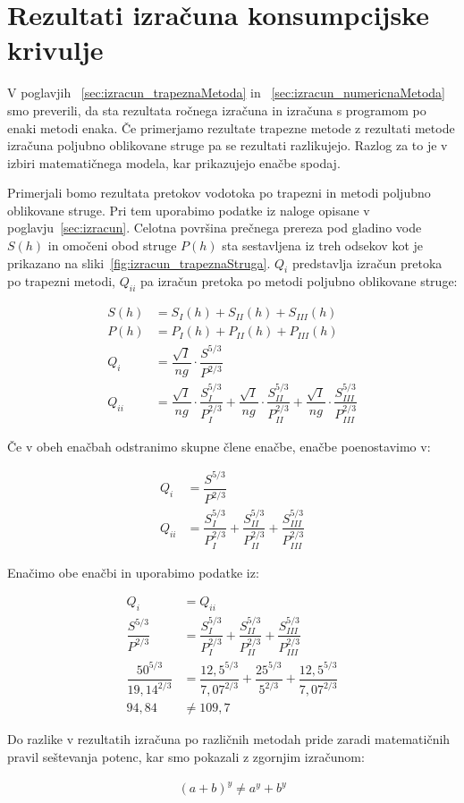 \section{Rezultati izračuna konsumpcijske krivulje}
V poglavjih ~\ref{sec:izracun_trapeznaMetoda} in ~\ref{sec:izracun_numericnaMetoda} smo preverili, da sta rezultata ročnega izračuna in izračuna s programom po enaki metodi enaka. Če primerjamo rezultate trapezne metode z rezultati metode izračuna poljubno oblikovane struge pa se rezultati razlikujejo. Razlog za to je v izbiri matematičnega modela, kar prikazujejo enačbe spodaj.

Primerjali bomo rezultata pretokov vodotoka po trapezni in metodi poljubno oblikovane struge. Pri tem uporabimo podatke iz naloge opisane v poglavju~\ref{sec:izracun}. Celotna površina prečnega prereza pod gladino vode $S(h)$ in omočeni obod struge $P(h)$ sta sestavljena iz treh odsekov kot je prikazano na sliki~\ref{fig:izracun_trapeznaStruga}. $Q_i$ predstavlja izračun pretoka po trapezni metodi, $Q_{ii}$ pa izračun pretoka po metodi poljubno oblikovane struge:
\begin{ceqn}
	\begin{align}
	S(h)&= S_I(h) + S_{II}(h) + S_{III}(h)\\
	P(h)&= P_I(h) + P_{II}(h) + P_{III}(h)\\
	Q_i &= \dfrac{\sqrt{I}}{ng} \cdot \dfrac{S^{5/3}}{P^{2/3}} \\
	Q_{ii} &= \dfrac{\sqrt{I}}{ng} \cdot \dfrac{S_I^{5/3}}{P_I^{2/3}} + \dfrac{\sqrt{I}}{ng} \cdot \dfrac{S_{II}^{5/3}}{P_{II}^{2/3}} + \dfrac{\sqrt{I}}{ng} \cdot \dfrac{S_{III}^{5/3}}{P_{III}^{2/3}}
	\end{align}
\end{ceqn}

Če v obeh enačbah odstranimo skupne člene enačbe, enačbe poenostavimo v:

\begin{ceqn}
	\begin{align}
	Q_i &=\dfrac{S^{5/3}}{P^{2/3}}\\
	Q_{ii} &= \dfrac{S_I^{5/3}}{P_I^{2/3}} + \dfrac{S_{II}^{5/3}}{P_{II}^{2/3}} + \dfrac{S_{III}^{5/3}}{P_{III}^{2/3}}
	\end{align}
\end{ceqn}


Enačimo obe enačbi in uporabimo podatke iz:
\begin{ceqn}
	\begin{align}
	Q_i &= Q_{ii}\\
	\dfrac{S^{5/3}}{P^{2/3}} &= \dfrac{S_I^{5/3}}{P_I^{2/3}} + \dfrac{S_{II}^{5/3}}{P_{II}^{2/3}} + \dfrac{S_{III}^{5/3}}{P_{III}^{2/3}}\\
	\dfrac{50^{5/3}}{19,14^{2/3}} &= \dfrac{12,5^{5/3}}{7,07^{2/3}} + \dfrac{25^{5/3}}{5^{2/3}} + \dfrac{12,5^{5/3}}{7,07^{2/3}}\\
	94,84 &\neq 109,7
	\end{align}
\end{ceqn}


Do razlike v rezultatih izračuna po različnih metodah pride zaradi matematičnih pravil seštevanja potenc, kar smo pokazali z zgornjim izračunom:
\begin{ceqn}
	\begin{align}
	(a+b)^y \neq a^y + b^y
	\end{align}
\end{ceqn}

